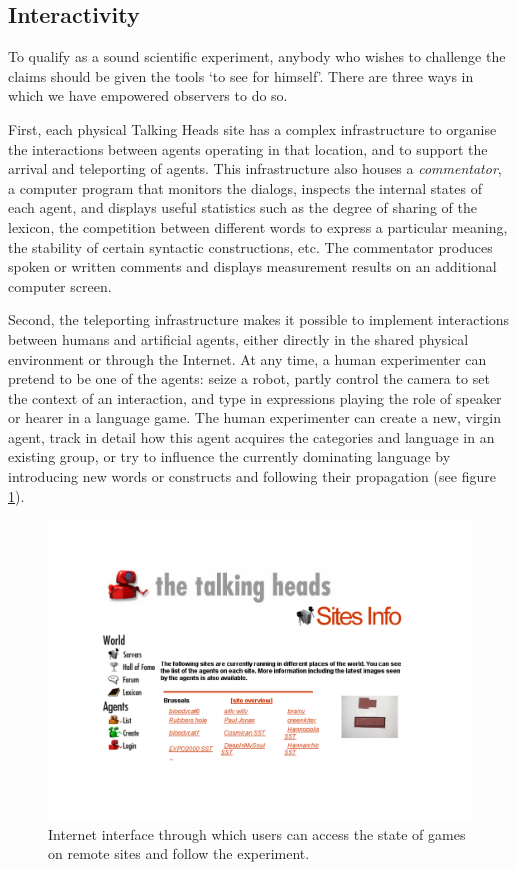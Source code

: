 \subsection{Interactivity}

To qualify as a sound scientific experiment, anybody 
who wishes to challenge the claims should be given 
the tools `to see for himself'. There are three 
ways in which we have empowered observers to do so. 

First, each physical Talking Heads site has 
a complex infrastructure to organise the interactions between
agents operating in that location, and to support the
arrival and teleporting of agents. This infrastructure also houses
a {\it commentator}, a computer program that
monitors the dialogs, inspects the internal states of each
agent, and displays useful statistics such as the degree
of sharing of the lexicon, the competition between different
words to express a particular meaning, the stability of 
certain syntactic constructions, etc. The commentator 
produces spoken or written comments and displays
measurement results on an additional computer screen. 

Second, the teleporting infrastructure makes it possible 
to implement interactions between humans and artificial agents, 
either directly in the shared physical environment or 
through the Internet. At any time, a human experimenter can
pretend to be one of the agents: seize 
a robot, partly control the
camera to set the context of an interaction, and type 
in expressions playing the role of speaker or hearer in 
a language game. The human experimenter can create a 
new, virgin agent, track in detail how this agent acquires the 
categories and language in an existing group, 
or try to influence the currently dominating language
by introducing new words or constructs and following
their propagation (see figure \ref{f:plate8}). 

\begin{figure}[htbp]
  \centerline{\includegraphics[width=.80\textwidth]{chap2/figs/interface}}
\caption{\small Internet interface through which users can 
access the state of games on remote sites and 
follow the experiment.}
\label{f:plate8}
\end{figure}

